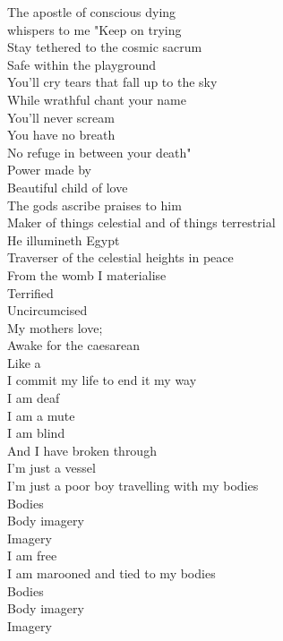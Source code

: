 
The apostle of conscious dying\\
whispers to me "Keep on trying\\
Stay tethered to the cosmic sacrum\\
Safe within the  playground\\
You'll cry tears that fall up to the sky\\
While wrathful  chant your name\\
You'll never scream\\
You have no breath\\
No refuge in between your death"\\

Power made by \\
Beautiful child of love\\
The gods ascribe praises to him\\
Maker of things celestial and of things terrestrial\\
He illumineth Egypt\\
Traverser of the celestial heights in peace\\

From the womb I materialise\\
Terrified\\
Uncircumcised\\
My mothers love; \\
Awake for the caesarean\\
Like a \\
I commit my life to end it my way\\
I am deaf\\
I am a mute\\
I am blind\\
And I have broken through\\

I'm just a vessel\\
I'm just a poor boy travelling with my bodies\\
Bodies\\
Body imagery\\
Imagery\\
I am free\\
I am marooned and tied to my bodies\\
Bodies\\
Body imagery\\
Imagery\\

